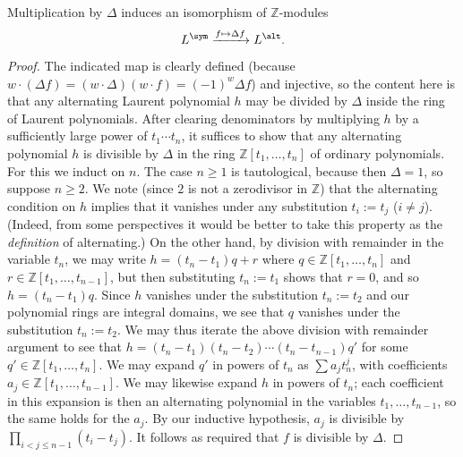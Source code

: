 \documentclass[reqno]{amsart} 
\begin{document}
\begin{lemma}
  Multiplication by $\Delta$ induces an isomorphism of $\mathbb{Z}$-modules
  \begin{equation}\label{eq:}
    L^{\sym} \xrightarrow{f \mapsto \Delta f} L^{\alt}.
  \end{equation}
\end{lemma}
\begin{proof}
  The indicated map is clearly defined (because $w \cdot (\Delta f) = (w \cdot \Delta) (w \cdot f) = (-1)^w \Delta f$) and injective, so the content here is that any alternating Laurent polynomial $h$ may be divided by $\Delta$ inside the ring of Laurent polynomials.  After clearing denominators by multiplying $h$ by a sufficiently large power of $t_1 \dotsb t_n$, it suffices to show that any alternating polynomial $h$ is divisible by $\Delta$ in the ring $\mathbb{Z}[t_1,\dotsc,t_n]$ of ordinary polynomials.  For this we induct on $n$.  The case $n \geq 1$ is tautological, because then $\Delta = 1$, so suppose $n \geq 2$.  We note (since $2$ is not a zerodivisor in $\mathbb{Z}$) that the alternating condition on $h$ implies that it vanishes under any substitution $t_i := t_j$ ($i \neq j$).  (Indeed, from some perspectives it would be better to take this property as the \emph{definition} of alternating.)  On the other hand, by division with remainder in the variable $t_n$, we may write $h = (t_n - t_1) q + r$ where $q \in \mathbb{Z}[t_1,\dotsc,t_n]$ and $r \in \mathbb{Z}[t_1,\dotsc,t_{n-1}]$, but then substituting $t_n := t_1$ shows that $r = 0$, and so $h = (t_n - t_1) q$.  Since $h$ vanishes under the substitution $t_n := t_2$ and our polynomial rings are integral domains, we see that $q$ vanishes under the substitution $t_n := t_2$.  We may thus iterate the above division with remainder argument to see that $h = (t_n - t_1) (t_n - t_2) \dotsb (t_n - t_{n-1}) q'$ for some $q' \in \mathbb{Z}[t_1,\dotsc,t_n]$.  We may expand $q '$ in powers of $t_n$ as $\sum a_j t_n^j$, with coefficients $a_j \in \mathbb{Z}[t_1,\dotsc,t_{n-1}]$.  We may likewise expand $h$ in powers of $t_n$; each coefficient in this expansion is then an alternating polynomial in the variables $t_1,\dotsc,t_{n-1}$, so the same holds for the $a_j$.  By our inductive hypothesis, $a_j$ is divisible by $\prod_{i < j \leq n-1} (t_i - t_j)$.  It follows as required that $f$ is divisible by $\Delta$.
\end{proof}
\end{document}
